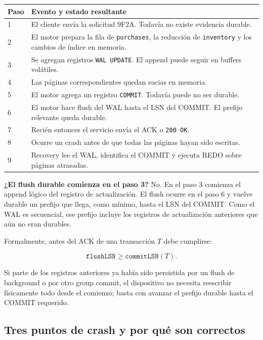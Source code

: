 \documentclass[variant=apuntes,cover=institutional,mode=screen]{ua-engineering-v6-article}
\begin{document}
\begin{center}
\begin{tabular}{p{}p{}}
\toprule
Paso & Evento y estado resultante \\
\midrule
1 & El cliente envía la solicitud 9F2A. Todavía no existe evidencia durable. \\
2 & El motor prepara la fila de \texttt{purchases}, la reducción de \texttt{inventory} y los cambios de índice en memoria. \\
3 & Se agregan registros \texttt{WAL UPDATE}. El append puede seguir en buffers volátiles. \\
4 & Las páginas correspondientes quedan sucias en memoria. \\
5 & El motor agrega un registro \texttt{COMMIT}. Todavía puede no ser durable. \\
6 & El motor hace flush del WAL hasta el LSN del COMMIT. El prefijo relevante queda durable. \\
7 & Recién entonces el servicio envía el ACK o \texttt{200 OK}. \\
8 & Ocurre un crash antes de que todas las páginas hayan sido escritas. \\
9 & Recovery lee el WAL, identifica el COMMIT y ejecuta REDO sobre páginas atrasadas. \\
\bottomrule
\end{tabular}
\end{center}

\begin{uainfo}
\textbf{¿El flush durable comienza en el paso 3?} No. En el paso 3 comienza el append lógico del registro de actualización. El flush ocurre en el paso 6 y vuelve durable un prefijo que llega, como mínimo, hasta el LSN del COMMIT. Como el WAL es secuencial, ese prefijo incluye los registros de actualización anteriores que aún no eran durables.
\end{uainfo}

Formalmente, antes del ACK de una transacción $T$ debe cumplirse:

\[
\texttt{flushLSN} \geq \texttt{commitLSN}(T).
\]

Si parte de los registros anteriores ya había sido persistida por un flush de background o por otro group commit, el dispositivo no necesita reescribir físicamente todo desde el comienzo; basta con avanzar el prefijo durable hasta el COMMIT requerido.

\subsection{Tres puntos de crash y por qué son correctos}
\end{document}
